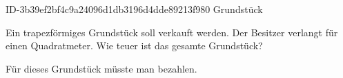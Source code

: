 \begin{exercise}
      {ID-3b39ef2bf4c9a24096d1db3196d4dde89213f980}
      {Grundstück}
  \ifproblem\problem\par
    \begin{minipage}[c]{0.38\textwidth}
      \centering
    \end{minipage}\hfill
    \begin{minipage}[c]{0.6\textwidth}
      Ein trapezförmiges Grundstück soll verkauft werden. Der Besitzer verlangt
       für einen Quadratmeter. Wie teuer ist das gesamte Grundstück?
    \end{minipage}
  \fi
  \ifoutcome\outcome\par
    Für dieses Grundstück müsste man  bezahlen.
  \fi
\end{exercise}
